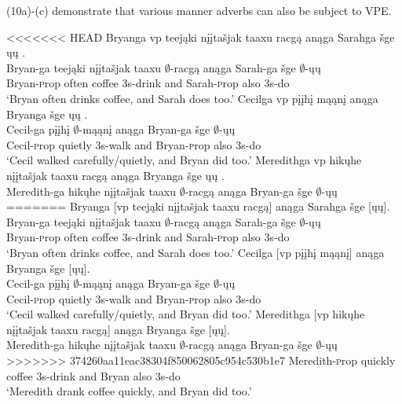 \documentclass[output=paper]{LSP/langsci}
\begin{document}
(10a)-(c) demonstrate that various manner adverbs can also be subject to VPE.

\begin{exe}
\ex
\begin{xlist}
\ex
<<<<<<< HEAD
\glll Bryanga  {\ob}{vp} teejąki {nįįtašjak taaxu} racgą{\cb} anąga Sarahga šge {\ob}ųų{\cb} .\\ 
Bryan-ga {} teejąki {nįįtašjak taaxu} $\emptyset$-racgą anąga Sarah-ga šge $\emptyset$-ųų\\
Bryan-{\textsc prop} {} often coffee {\textsc 3s}-drink and Sarah-{\textsc prop} also {\textsc 3s}-do\\
\trans `Bryan often drinks coffee, and Sarah does too.'
\ex
\glll Cecilga  {\ob}{vp} pįįhį mąąnį{\cb} anąga Bryanga šge {\ob}ųų{\cb} .\\
Cecil-ga {} pįįhį $\emptyset$-mąąnį anąga Bryan-ga šge $\emptyset$-ųų\\
Cecil-{\textsc prop} {} quietly {\textsc 3s}-walk and Bryan-{\textsc prop} also {\textsc 3s}-do\\
\trans `Cecil walked carefully/quietly, and Bryan did too.'
\ex
\glll Meredithga {\ob}{vp} hikųhe {nįįtašjak taaxu} racgą{\cb} anąga Bryanga šge {\ob}ųų{\cb} .\\
Meredith-ga {} hikųhe {nįįtašjak taaxu} $\emptyset$-racgą anąga Bryan-ga šge $\emptyset$-ųų\\
=======
\glll Bryanga  {\textsc [vp} teej\k{a}ki {n\k{i}\k{i}ta\v{s}jak taaxu} racg\k{a}{\textsc ]} an\k{a}ga Sarahga \v{s}ge {\textsc [}\k{u}\k{u}{\textsc ]}.\\ 
Bryan-ga {} teej\k{a}ki {n\k{i}\k{i}ta\v{s}jak taaxu} $\emptyset$-racg\k{a} an\k{a}ga Sarah-ga \v{s}ge $\emptyset$-\k{u}\k{u}\\
Bryan-{\textsc prop} {} often coffee {\textsc 3s}-drink and Sarah-{\textsc prop} also {\textsc 3s}-do\\
\trans `Bryan often drinks coffee, and Sarah does too.'
\ex
\glll Cecilga  {\textsc [vp} p\k{i}\k{i}h\k{i} m\k{a}\k{a}n\k{i}{\textsc ]} an\k{a}ga Bryanga \v{s}ge {\textsc [}\k{u}\k{u}{\textsc ]}.\\
Cecil-ga {} p\k{i}\k{i}h\k{i} $\emptyset$-m\k{a}\k{a}n\k{i} an\k{a}ga Bryan-ga \v{s}ge $\emptyset$-\k{u}\k{u}\\
Cecil-{\textsc prop} {} quietly {\textsc 3s}-walk and Bryan-{\textsc prop} also {\textsc 3s}-do\\
\trans `Cecil walked carefully/quietly, and Bryan did too.'
\ex
\glll Meredithga {\textsc [vp} hik\k{u}he {n\k{i}\k{i}ta\v{s}jak taaxu} racg\k{a}{\textsc ]} an\k{a}ga Bryanga \v{s}ge {\textsc [}\k{u}\k{u}{\textsc ]}.\\
Meredith-ga {} hik\k{u}he {n\k{i}\k{i}ta\v{s}jak taaxu} $\emptyset$-racg\k{a} an\k{a}ga Bryan-ga \v{s}ge $\emptyset$-\k{u}\k{u}\\
>>>>>>> 374260aa11eac38304f850062805c954c530b1e7
Meredith-{\textsc prop} {} quickly coffee {\textsc 3s}-drink and Bryan also {\textsc 3s}-do\\
\trans `Meredith drank coffee quickly, and Bryan did too.'
\end{xlist}
\end{exe}
\end{document}
